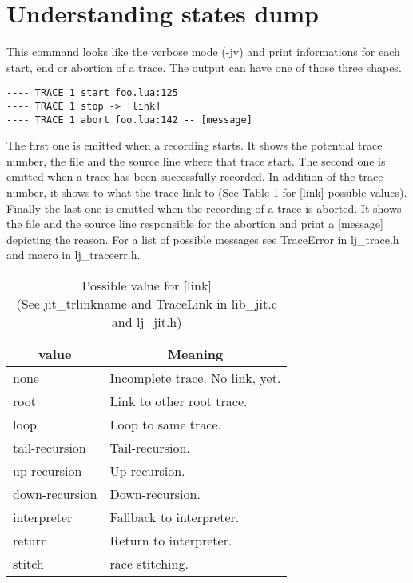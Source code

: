 \section{Understanding states dump}
\label{Sec:dump-states}
This command looks like the verbose mode (-jv) and print informations for each start,
end or abortion of a trace. The output can have one of those three shapes.
\begin{verbatim}
---- TRACE 1 start foo.lua:125
---- TRACE 1 stop -> [link]
---- TRACE 1 abort foo.lua:142 -- [message]
\end{verbatim}
The first one is emitted when a recording starts. It shows the potential
trace number, the file and the source line where that trace start.
The second one is emitted when a trace has been successfully recorded. In
addition of the trace number, it shows to what the trace link to (See Table
\ref{tab:dump-link} for [link] possible values). Finally the last one is emitted
when the recording of a trace is aborted. It shows the file and the source line
responsible for the abortion and print a [message] depicting the reason. For
a list of possible messages see TraceError in lj\_trace.h and macro in
lj\_traceerr.h.

\begin{table}
\centering
\begin{tabular}{|l|l|}
\hline
\multicolumn{1}{|c|}{value} & \multicolumn{1}{c|}{Meaning}\\\hline
none                        & Incomplete trace. No link, yet.\\
root                        & Link to other root trace.\\
loop                        & Loop to same trace.\\
tail-recursion              & Tail-recursion.\\
up-recursion                & Up-recursion.\\
down-recursion              & Down-recursion.\\
interpreter                 & Fallback to interpreter.\\
return                      & Return to interpreter.\\
stitch                      & race stitching.\\\hline
\end{tabular}
\caption{
  Possible value for [link] \\(See jit\_trlinkname and TraceLink in lib\_jit.c
  and lj\_jit.h)
}
\label{tab:dump-link}
\end{table}


